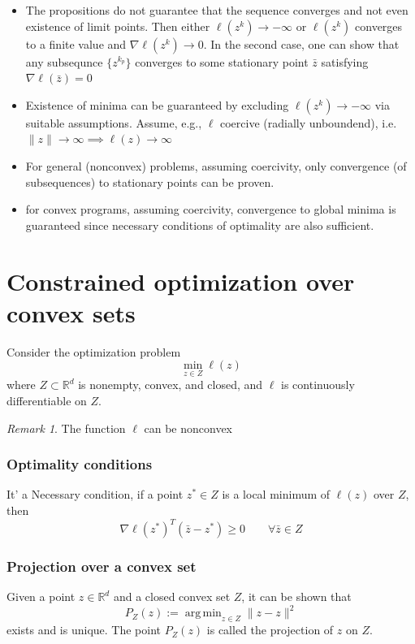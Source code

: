 \documentclass[openany]{book}
\DeclareMathOperator*{\argmin}{arg\,min}   %
\newcommand{\R}{\mathbb{R}}                %
\theoremstyle{definition}
\theoremstyle{remark}
\newtheorem*{remark}{Remark}
\begin{document}
\begin{itemize}
    \item The propositions do not guarantee that the sequence converges and not even existence of limit points. Then either $\ell(z^k)\to-\infty$ or $\ell(z^k)$ converges to a finite value and $\nabla\ell(z^k)\to 0$. In the second case, one can show that any subsequnce $\{z^{k_p}\}$ converges to some stationary point $\bar{z}$ satisfying $\nabla\ell(\bar{z})=0$
    \item Existence of minima can be guaranteed by excluding $\ell(z^k)\to-\infty$ via suitable assumptions. Assume, e.g., $\ell$ coercive (radially unboundend), i.e. $\|z\|\to\infty\implies \ell(z)\to\infty$
    \item For general (nonconvex) problems, assuming coercivity, only convergence (of subsequences) to stationary points can be proven.
    \item for convex programs, assuming coercivity, convergence to global minima is guaranteed since necessary conditions of optimality are also sufficient.
\end{itemize}

\section{Constrained optimization over convex sets}

Consider the optimization problem 
\[
    \min_{z\in Z}\ell(z)
\]
where $Z \subset \R^d$ is nonempty, convex, and closed, and $\ell$ is continuously differentiable on $Z$. 
\begin{remark}
    The function $\ell$ can be nonconvex
\end{remark}

\subsubsection{Optimality conditions}
It' a Necessary condition, if a point $z^* \in Z$ is a local minimum of $\ell(z)$ over $Z$, then 
\[
    \nabla\ell(z^*)^T(\bar{z}-z^*)\geq 0 \qquad \forall\bar{z}\in Z
\]


\subsubsection{Projection over a convex set}
Given a point $z\in\R^d$ and a closed convex set $Z$, it can be shown that 
\[
    P_Z(z) := \argmin_{z\in Z}\|z-z\|^2
\]
exists and is unique. The point $P_Z(z)$ is called the projection of $z$ on $Z$.
\end{document}
